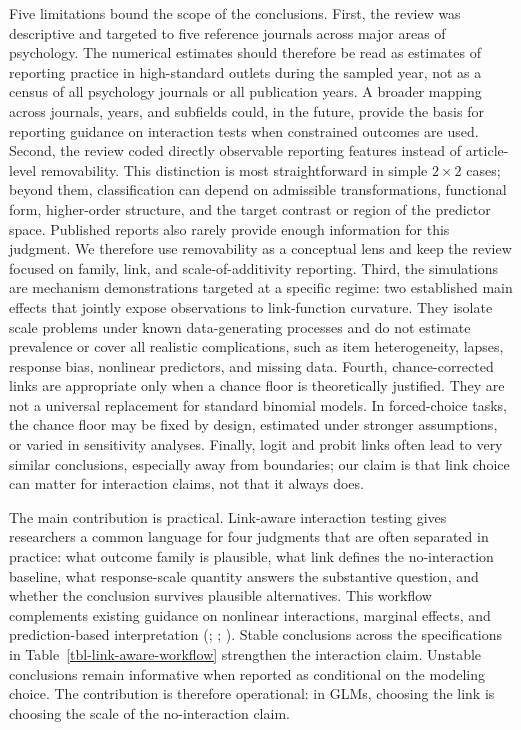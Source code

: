 \documentclass[
  man,
  longtable,
  nolmodern,
  notxfonts,
  notimes,
  colorlinks=true,linkcolor=blue,citecolor=blue,urlcolor=blue]{apa7}
\begin{document}
Five limitations bound the scope of the conclusions. First, the review
was descriptive and targeted to five reference journals across major
areas of psychology. The numerical estimates should therefore be read as
estimates of reporting practice in high-standard outlets during the
sampled year, not as a census of all psychology journals or all
publication years. A broader mapping across journals, years, and
subfields could, in the future, provide the basis for reporting guidance
on interaction tests when constrained outcomes are used. Second, the
review coded directly observable reporting features instead of
article-level removability. This distinction is most straightforward in
simple \(2 \times 2\) cases; beyond them, classification can depend on
admissible transformations, functional form, higher-order structure, and
the target contrast or region of the predictor space. Published reports
also rarely provide enough information for this judgment. We therefore
use removability as a conceptual lens and keep the review focused on
family, link, and scale-of-additivity reporting. Third, the simulations
are mechanism demonstrations targeted at a specific regime: two
established main effects that jointly expose observations to
link-function curvature. They isolate scale problems under known
data-generating processes and do not estimate prevalence or cover all
realistic complications, such as item heterogeneity, lapses, response
bias, nonlinear predictors, and missing data. Fourth, chance-corrected
links are appropriate only when a chance floor is theoretically
justified. They are not a universal replacement for standard binomial
models. In forced-choice tasks, the chance floor may be fixed by design,
estimated under stronger assumptions, or varied in sensitivity analyses.
Finally, logit and probit links often lead to very similar conclusions,
especially away from boundaries; our claim is that link choice can
matter for interaction claims, not that it always does.

The main contribution is practical. Link-aware interaction testing gives
researchers a common language for four judgments that are often
separated in practice: what outcome family is plausible, what link
defines the no-interaction baseline, what response-scale quantity
answers the substantive question, and whether the conclusion survives
plausible alternatives. This workflow complements existing guidance on
nonlinear interactions, marginal effects, and prediction-based
interpretation (;
; ). Stable conclusions across the specifications in
Table~\ref{tbl-link-aware-workflow} strengthen the interaction claim.
Unstable conclusions remain informative when reported as conditional on
the modeling choice. The contribution is therefore operational: in GLMs,
choosing the link is choosing the scale of the no-interaction claim.
\end{document}
